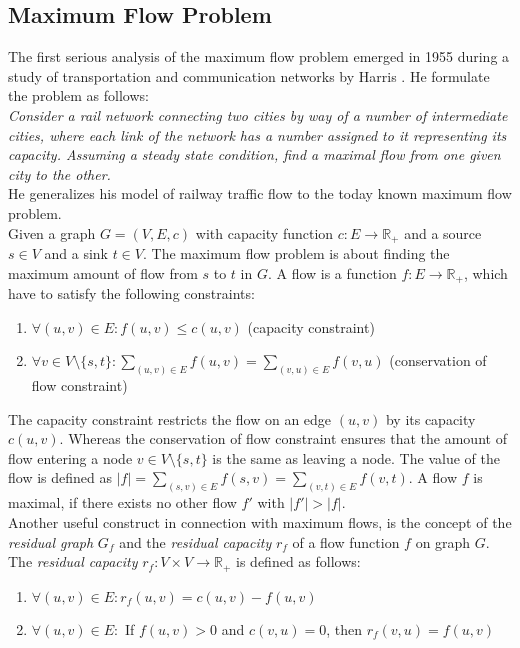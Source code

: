 
\subsection{Maximum Flow Problem}
\label{sec:max_flow}

The first serious analysis of the maximum flow problem emerged in 1955 during 
a study of transportation and communication networks by Harris \cite{harris1955}. 
He formulate the problem as follows: \\
\emph{Consider a rail network connecting two cities by way of a number of
intermediate cities, where each link of the network has a number assigned to
it representing its capacity. Assuming a steady state condition, find a maximal
flow from one given city to the other.} \\
He generalizes his model of railway traffic flow to the today known maximum 
flow problem. \\
Given a graph $G = (V,E,c)$ with capacity function $c: E \rightarrow \mathbb{R}_+$ and a source 
$s \in V$ and a sink $t \in V$. The maximum flow problem is about finding 
the maximum amount of flow from $s$ to $t$ in $G$. A flow is a function 
$f: E \rightarrow \mathbb{R}_+$, which have to satisfy the following constraints:
\begin{enumerate}
\item $\forall (u,v) \in E: f(u,v) \le c(u,v)$ (capacity constraint)
\item $\forall v \in V \setminus \{s,t\}: \sum_{(u,v) \in E} f(u,v) = \sum_{(v,u) \in E} f(v,u)$ (conservation of flow constraint)
\end{enumerate}
The capacity constraint restricts the flow on an edge $(u,v)$ by its capacity 
$c(u,v)$. Whereas the conservation of flow constraint ensures that the amount
of flow entering a node $v \in V \setminus \{s,t\}$ is the same as leaving a node.
The value of the flow is defined as $|f| = \sum_{(s,v) \in E} f(s,v) = \sum_{(v,t) \in E} f(v,t)$.
A flow $f$ is maximal, if there exists no other flow $f'$ with $|f'| > |f|$. \\
Another useful construct in connection with maximum flows, is the concept of the
\emph{residual graph} $G_f$ and the \emph{residual capacity} $r_f$ of a flow function $f$ on graph $G$.
The \emph{residual capacity} $r_f: V \times V \rightarrow \mathbb{R}_+$ is defined as follows:
\begin{enumerate}
\item $\forall (u,v) \in E: r_f(u,v) = c(u,v) - f(u,v)$
\item $\forall (u,v) \in E:$ If $f(u,v) > 0$ and $c(v,u) = 0$, then $r_f(v,u) = f(u,v)$
\end{enumerate}
